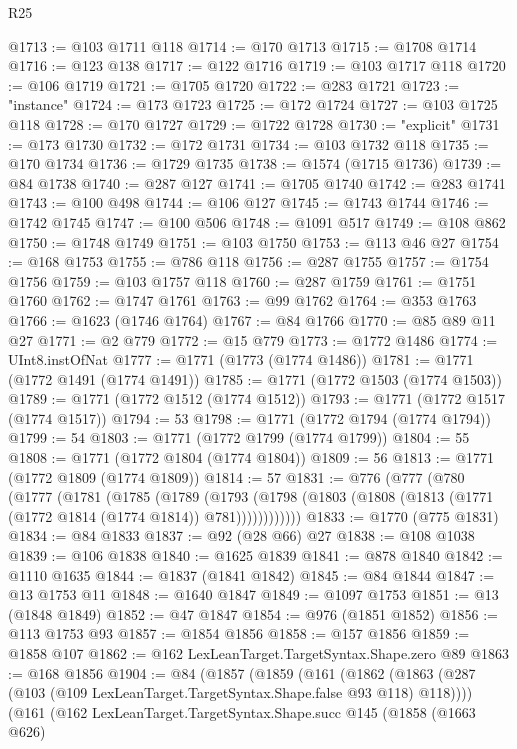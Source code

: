 \begin{lexlean}{R25}
\begin{coremodule}
@1713 := @103 @1711 @118
@1714 := @170 @1713
@1715 := @1708 @1714
@1716 := @123 @138
@1717 := @122 @1716
@1719 := @103 @1717 @118
@1720 := @106 @1719
@1721 := @1705 @1720
@1722 := @283 @1721
@1723 := "instance"
@1724 := @173 @1723
@1725 := @172 @1724
@1727 := @103 @1725 @118
@1728 := @170 @1727
@1729 := @1722 @1728
@1730 := "explicit"
@1731 := @173 @1730
@1732 := @172 @1731
@1734 := @103 @1732 @118
@1735 := @170 @1734
@1736 := @1729 @1735
@1738 := @1574 (@1715 @1736)
@1739 := @84 @1738
@1740 := @287 @127
@1741 := @1705 @1740
@1742 := @283 @1741
@1743 := @100 @498
@1744 := @106 @127
@1745 := @1743 @1744
@1746 := @1742 @1745
@1747 := @100 @506
@1748 := @1091 @517
@1749 := @108 @862
@1750 := @1748 @1749
@1751 := @103 @1750
@1753 := @113 @46 @27
@1754 := @168 @1753
@1755 := @786 @118
@1756 := @287 @1755
@1757 := @1754 @1756
@1759 := @103 @1757 @118
@1760 := @287 @1759
@1761 := @1751 @1760
@1762 := @1747 @1761
@1763 := @99 @1762
@1764 := @353 @1763
@1766 := @1623 (@1746 @1764)
@1767 := @84 @1766
@1770 := @85 @89 @11 @27
@1771 := @2 @779
@1772 := @15 @779
@1773 := @1772 @1486
@1774 := UInt8.instOfNat
@1777 := @1771 (@1773 (@1774 @1486))
@1781 := @1771 (@1772 @1491 (@1774 @1491))
@1785 := @1771 (@1772 @1503 (@1774 @1503))
@1789 := @1771 (@1772 @1512 (@1774 @1512))
@1793 := @1771 (@1772 @1517 (@1774 @1517))
@1794 := 53
@1798 := @1771 (@1772 @1794 (@1774 @1794))
@1799 := 54
@1803 := @1771 (@1772 @1799 (@1774 @1799))
@1804 := 55
@1808 := @1771 (@1772 @1804 (@1774 @1804))
@1809 := 56
@1813 := @1771 (@1772 @1809 (@1774 @1809))
@1814 := 57
@1831 := @776
    (@777
      (@780
        (@1777
          (@1781
            (@1785
              (@1789
                (@1793
                  (@1798 (@1803 (@1808 (@1813 (@1771 (@1772 @1814 (@1774 @1814)) @781))))))))))))
@1833 := @1770 (@775 @1831)
@1834 := @84 @1833
@1837 := @92 (@28 @66) @27
@1838 := @108 @1038
@1839 := @106 @1838
@1840 := @1625 @1839
@1841 := @878 @1840
@1842 := @1110 @1635
@1844 := @1837 (@1841 @1842)
@1845 := @84 @1844
@1847 := @13 @1753 @11
@1848 := @1640 @1847
@1849 := @1097 @1753
@1851 := @13 (@1848 @1849)
@1852 := @47 @1847
@1854 := @976 (@1851 @1852)
@1856 := @113 @1753 @93
@1857 := @1854 @1856
@1858 := @157 @1856
@1859 := @1858 @107
@1862 := @162 LexLeanTarget.TargetSyntax.Shape.zero @89
@1863 := @168 @1856
@1904 := @84
    (@1857
      (@1859
        (@161
          (@1862 (@1863 (@287 (@103 (@109 LexLeanTarget.TargetSyntax.Shape.false @93 @118) @118))))
          (@161
            (@162
              LexLeanTarget.TargetSyntax.Shape.succ
              @145
              (@1858
                (@1663 @626)

\end{coremodule}
\end{lexlean}
